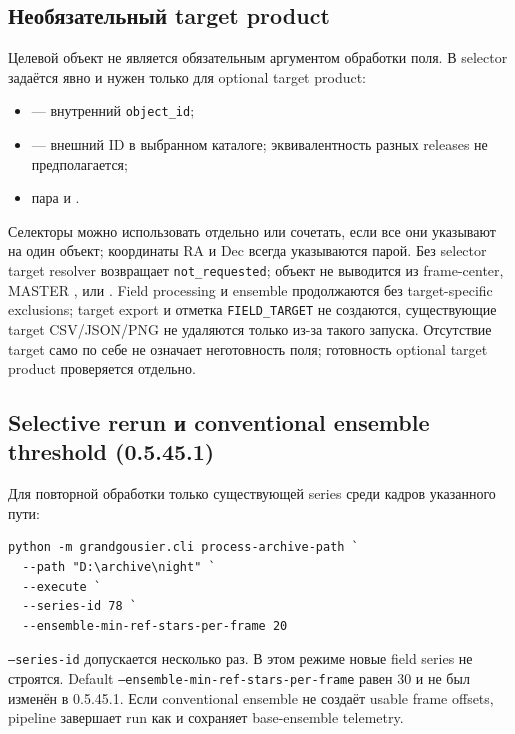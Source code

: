 \subsection{Необязательный target product}

Целевой объект не является обязательным аргументом обработки поля. В  selector задаётся явно и нужен только для optional target product:

\begin{itemize}
  \item {} --- внутренний \texttt{object\_id};
  \item {} --- внешний ID в выбранном каталоге; эквивалентность разных releases не предполагается;
  \item пара  и .
\end{itemize}

Селекторы можно использовать отдельно или сочетать, если все они указывают на один объект; координаты RA и Dec всегда указываются парой. Без selector target resolver возвращает \texttt{not\_requested}; объект не выводится из frame-center, MASTER ,  или . Field processing и ensemble продолжаются без target-specific exclusions; target export и отметка \texttt{FIELD\_TARGET} не создаются, существующие target CSV/JSON/PNG не удаляются только из-за такого запуска. Отсутствие target само по себе не означает неготовность поля; готовность optional target product проверяется отдельно.

\subsection{Selective rerun и conventional ensemble threshold (0.5.45.1)}

Для повторной обработки только существующей series среди кадров указанного пути:
\begin{lstlisting}
python -m grandgousier.cli process-archive-path `
  --path "D:\archive\night" `
  --execute `
  --series-id 78 `
  --ensemble-min-ref-stars-per-frame 20
\end{lstlisting}
\texttt{--series-id} допускается несколько раз. В этом режиме новые field series не строятся.
Default \texttt{--ensemble-min-ref-stars-per-frame} равен 30 и не был изменён в 0.5.45.1.
Если conventional ensemble не создаёт usable frame offsets, pipeline завершает run как
 и сохраняет base-ensemble telemetry.

